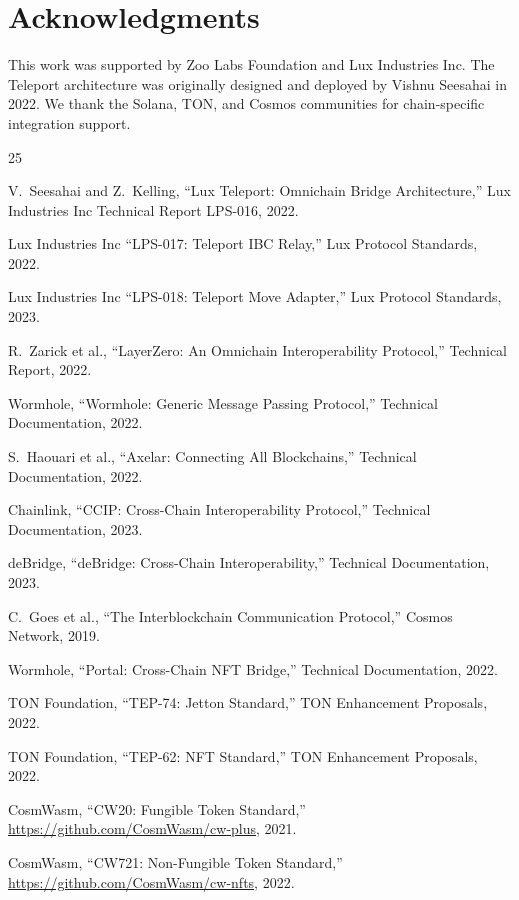 \documentclass[11pt,letterpaper]{article}
\begin{document}
\section*{Acknowledgments}

This work was supported by Zoo Labs Foundation and Lux Industries Inc. The Teleport architecture was originally designed and deployed by Vishnu Seesahai in 2022. We thank the Solana, TON, and Cosmos communities for chain-specific integration support.


\begin{thebibliography}{25}

V.~Seesahai and Z.~Kelling, ``Lux Teleport: Omnichain Bridge Architecture,'' Lux Industries Inc Technical Report LPS-016, 2022.

Lux Industries Inc ``LPS-017: Teleport IBC Relay,'' Lux Protocol Standards, 2022.

Lux Industries Inc ``LPS-018: Teleport Move Adapter,'' Lux Protocol Standards, 2023.

R.~Zarick et al., ``LayerZero: An Omnichain Interoperability Protocol,'' Technical Report, 2022.

Wormhole, ``Wormhole: Generic Message Passing Protocol,'' Technical Documentation, 2022.

S.~Haouari et al., ``Axelar: Connecting All Blockchains,'' Technical Documentation, 2022.

Chainlink, ``CCIP: Cross-Chain Interoperability Protocol,'' Technical Documentation, 2023.

deBridge, ``deBridge: Cross-Chain Interoperability,'' Technical Documentation, 2023.

C.~Goes et al., ``The Interblockchain Communication Protocol,'' Cosmos Network, 2019.

Wormhole, ``Portal: Cross-Chain NFT Bridge,'' Technical Documentation, 2022.

TON Foundation, ``TEP-74: Jetton Standard,'' TON Enhancement Proposals, 2022.

TON Foundation, ``TEP-62: NFT Standard,'' TON Enhancement Proposals, 2022.

CosmWasm, ``CW20: Fungible Token Standard,'' \url{https://github.com/CosmWasm/cw-plus}, 2021.

CosmWasm, ``CW721: Non-Fungible Token Standard,'' \url{https://github.com/CosmWasm/cw-nfts}, 2022.


\end{thebibliography}
\end{document}
